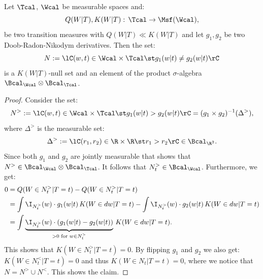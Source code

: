 \begin{Lem}
    \label{lem:doob-radon-nikodym-unique}
    Let $\Tcal$, $\Wcal$ be measurable spaces and:
    \[ Q(W|T), K(W|T) :\, \Tcal \to \Msf(\Wcal), \]
    be two transition measures with $Q(W|T) \ll K(W|T)$ and let $g_1,g_2$ be two Doob-Radon-Nikodym derivatives. 
    Then the set:
    \[ N:=\lC (w,t) \in \Wcal \times \Tcal \st g_1(w|t) \neq g_2(w|t) \rC \]
    is a $K(W|T)$-null set and an element of the product $\sigma$-algebra $\Bcal_\Wcal\otimes\Bcal_\Tcal$.
    \begin{proof}
        Consider the set:
        \[ N^>:= \lC (w,t) \in \Wcal \times \Tcal \st g_1(w|t) > g_2(w|t) \rC = (g_1 \times g_2)^{-1}(\Delta^>),\]
        where $\Delta^>$ is the measurable set:
        \[ \Delta^>:=\lC (r_1,r_2) \in \R \times \R \st r_1 >r_2 \rC  \in \Bcal_{\R^2}.\]
        Since both $g_1$ and $g_2$ are jointly measurable that shows that $N^> \in \Bcal_\Wcal\otimes\Bcal_\Tcal$.
        It follows that $N^>_t \in \Bcal_\Wcal$.
        Furthermore, we get:
        \begin{align*}
            0 &=   Q(W \in N^>_t|T=t) - Q(W \in N^>_t|T=t) \\
              &= \int \I_{N^>_t}(w) \cdot g_1(w|t) \, K(W \in dw|T=t) - \int \I_{N^>_t}(w) \cdot g_2(w|t) \, K(W \in dw|T=t)\\
              &= \int \underbrace{\I_{N^>_t}(w) \cdot (g_1(w|t) - g_2(w|t))}_{> 0 \text{ for }  w\in N^>_t} \, K(W \in dw|T=t).
          \end{align*}
          This shows that $K(W \in N^>_t|T=t) =0$. By flipping $g_1$ and $g_2$ we also get: $K(W \in N^<_t|T=t) =0$
          and thus $K(W \in N_t|T=t) =0$, where we notice that $N = N^> \cup N^<$.
          This shows the claim.
    \end{proof}
\end{Lem}



